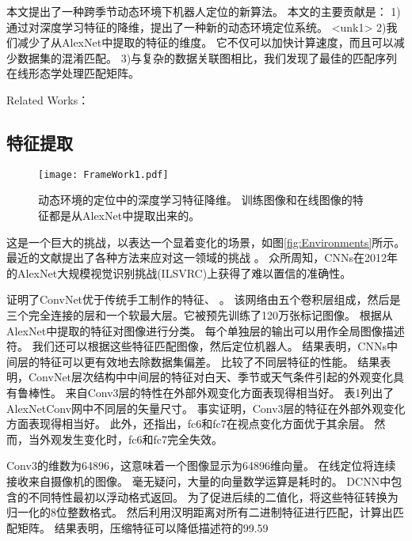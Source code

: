  本文提出了一种跨季节动态环境下机器人定位的新算法。 本文的主要贡献是：
 1)通过对深度学习特征的降维，提出了一种新的动态环境定位系统。
 <unk1> 2)我们减少了从AlexNet中提取的特征的维度。 它不仅可以加快计算速度，而且可以减少数据集的混淆匹配。
 3)与复杂的数据关联图相比，我们发现了最佳的匹配序列在线形态学处理匹配矩阵。

Related Works：
\subsection{特征提取}
\begin{figure}[H]
  \centering
  \texttt{[image: FrameWork1.pdf]}
  \caption{ 动态环境的定位中的深度学习特征降维。 训练图像和在线图像的特征都是从AlexNet中提取出来的。}
  \label{fig:Framework}
\end{figure}

这是一个巨大的挑战，以表达一个显着变化的场景，如图\ref{fig:Environments}所示。 最近的文献提出了各种方法来应对这一领域的挑战\cite{milford2012seqslam} \cite{corke2013dealing} \cite{neubert2015superpixel} \cite{mcmanus2015learning} \cite{naseer2014robust} \cite{churchill2012practication} \cite{lowry2014transforming}。
 众所周知，CNNs在2012年的AlexNet大规模视觉识别挑战(ILSVRC)上获得了难以置信的准确性\cite{krizhevsky2012imagenet}。

 \cite{donahue2014decaf} \cite{girshick2014rich} \cite{krizhevsky2012imagenet} \cite{sermanet2013overfeat} \cite{sharif2014cnn}证明了ConvNet优于传统手工制作的特征、\cite{SURF2006surf} \cite{ORB2011orb} \cite{lowe2004incent}。 该网络由五个卷积层组成，然后是三个完全连接的层和一个软最大层。它被预先训练了120万张标记图像。 根据从AlexNet中提取的特征对图像进行分类。 每个单独层的输出可以用作全局图像描述符。 我们还可以根据这些特征匹配图像，然后定位机器人。
 \cite{donahue2014decaf} 结果表明，CNNs中间层的特征可以更有效地去除数据集偏差。\cite{sunderhauf2015performance} 比较了不同层特征的性能。 结果表明，ConvNet层次结构中中间层的特征对白天、季节或天气条件引起的外观变化具有鲁棒性。 来自Conv3层的特性在外部外观变化方面表现得相当好。 表1列出了AlexNetConv网中不同层的矢量尺寸。 事实证明\cite{sunderhauf2015performance}，Conv3层的特征在外部外观变化方面表现得相当好。 此外，\cite{sunderhauf2015performance}还指出，fc6和fc7在视点变化方面优于其余层。 然而，当外观发生变化时，fc6和fc7完全失效。

Conv3的维数为64896，这意味着一个图像显示为64896维向量。 在线定位将连续接收来自摄像机的图像。 毫无疑问，大量的向量数学运算是耗时的。 DCNN中包含的不同特性最初以浮动格式返回。 为了促进后续的二值化，\cite{arroyo2016fusion}将这些特征转换为归一化的8位整数格式。 然后利用汉明距离对所有二进制特征进行匹配，计算出匹配矩阵。 结果表明，压缩特征可以降低描述符的99.59%

